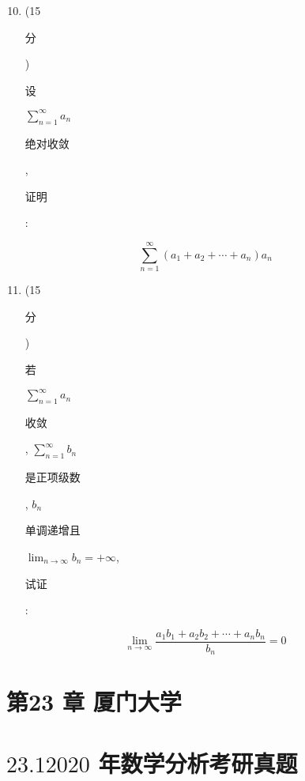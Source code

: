 \documentclass[10pt]{article}
\begin{document}
\begin{enumerate}
  \setcounter{enumi}{9}
  \item (15 \begin{CJK}{UTF8}{mj}分\end{CJK}) \begin{CJK}{UTF8}{mj}设\end{CJK} $\sum_{n=1}^{\infty} a_{n}$ \begin{CJK}{UTF8}{mj}绝对收敛\end{CJK}, \begin{CJK}{UTF8}{mj}证明\end{CJK}:
\end{enumerate}
$$
\sum_{n=1}^{\infty}\left(a_{1}+a_{2}+\cdots+a_{n}\right) a_{n}
$$

\begin{enumerate}
  \setcounter{enumi}{10}
  \item (15 \begin{CJK}{UTF8}{mj}分\end{CJK}) \begin{CJK}{UTF8}{mj}若\end{CJK} $\sum_{n=1}^{\infty} a_{n}$ \begin{CJK}{UTF8}{mj}收敛\end{CJK}, $\sum_{n=1}^{\infty} b_{n}$ \begin{CJK}{UTF8}{mj}是正项级数\end{CJK}, $b_{n}$ \begin{CJK}{UTF8}{mj}单调递增且\end{CJK} $\lim _{n \rightarrow \infty} b_{n}=+\infty$, \begin{CJK}{UTF8}{mj}试证\end{CJK}:
\end{enumerate}
$$
\lim _{n \rightarrow \infty} \frac{a_{1} b_{1}+a_{2} b_{2}+\cdots+a_{n} b_{n}}{b_{n}}=0
$$

\section{第23 章 厦门大学}
\section{$23.12020$ 年数学分析考研真题}
\end{document}
